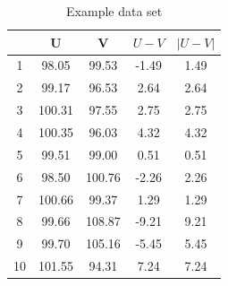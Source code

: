 \documentclass[12pt, a4paper]{report}
\theoremstyle{plain}
\theoremstyle{definition}
\theoremstyle{remark}
\begin{document}




\begin{table}[ht]
	\centering
	\begin{tabular}{|c|c|c|c|c|}
		\hline
		& U & V & $U-V$ & $|U-V|$ \\ 
		\hline
		1 & 98.05 & 99.53 & -1.49 & 1.49 \\ 
		2 & 99.17 & 96.53 & 2.64 & 2.64 \\ 
		3 & 100.31 & 97.55 & 2.75 & 2.75 \\ 
		4 & 100.35 & 96.03 & 4.32 & 4.32 \\ 
		5 & 99.51 & 99.00 & 0.51 & 0.51 \\ 
		6 & 98.50 & 100.76 & -2.26 & 2.26 \\ 
		7 & 100.66 & 99.37 & 1.29 & 1.29 \\ 
		8 & 99.66 & 108.87 & -9.21 & 9.21 \\ 
		9 & 99.70 & 105.16 & -5.45 & 5.45 \\ 
		10 & 101.55 & 94.31 & 7.24 & 7.24 \\ 
		\hline
	\end{tabular}
	\caption{Example data set}
	\label{EADdata}
\end{table}
\end{document}
